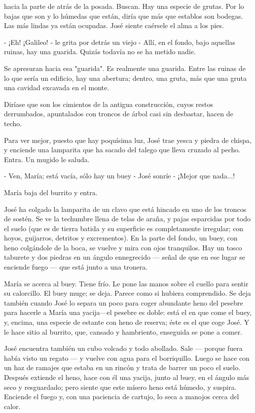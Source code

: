 \documentclass[12pt, twoside, openright]{book} %
\begin{document}
hacia la parte de atrás de la posada. Buscan. Hay una especie de grutas. Por lo bajas que son y lo húmedas que están, diría que más que establos son bodegas. Las más lindas ya están ocupadas. José siente caérsele el alma a los pies. 

- ¡Eh! ¡Galileo! - le grita por detrás un viejo - Allí, en el fondo, bajo aquellas ruinas, hay una guarida. Quizás todavía no se ha metido nadie. 

Se apresuran hacia esa "guarida". Es realmente una guarida. Entre las ruinas de lo que sería un edificio, hay una abertura; dentro, una gruta, más que una gruta una cavidad excavada en el monte. 

Diríase que son los cimientos de la antigua construcción, cuyos restos derrumbados, apuntalados con troncos de árbol casi sin desbastar, hacen de techo. 

Para ver mejor, puesto que hay poquísima luz, José trae yesca y piedra de chispa, y enciende una lamparita que ha sacado del talego que lleva cruzado al pecho. Entra. Un mugido le saluda. 

- Ven, María; está vacía, sólo hay un buey - José sonríe - ¡Mejor que nada...! 

María baja del burrito y entra. 

José ha colgado la lamparita de un clavo que está hincado en uno de los troncos de sostén. Se ve la techumbre llena de telas de araña, y pajas esparcidas por todo el suelo (que es de tierra batida y su superficie es completamente irregular; con hoyos, guijarros, detritos y excrementos). En la parte del fondo, un buey, con heno colgándole de la boca, se vuelve y mira con ojos tranquilos. Hay un tosco taburete y dos piedras en un ángulo ennegrecido — señal de que en ese lugar se enciende fuego — que está junto a una tronera. 

María se acerca al buey. Tiene frío. Le pone las manos sobre el cuello para sentir su calorcillo. El buey muge; se deja. Parece como si hubiera comprendido. Se deja también cuando José lo separa un poco para coger abundante heno del pesebre para hacerle a María una yacija—el pesebre es doble: está el en que come el buey, y, encima, una especie de estante con heno de reserva; éste es el que coge José. Y le hace sitio al burrito, que, cansado y hambriento, enseguida se pone a comer. 

José encuentra también un cubo volcado y todo abollado. Sale — porque fuera había visto un regato — y vuelve con agua para el borriquillo. Luego se hace con un haz de ramajes que estaba en un rincón y trata de barrer un poco el suelo. Después extiende el heno, hace con él una yacija, junto al buey, en el ángulo más seco y resguardado; pero siente que este mísero heno está húmedo, y suspira. Enciende el fuego y, con una paciencia de cartujo, lo seca a manojos cerca del calor. 
\end{document}
